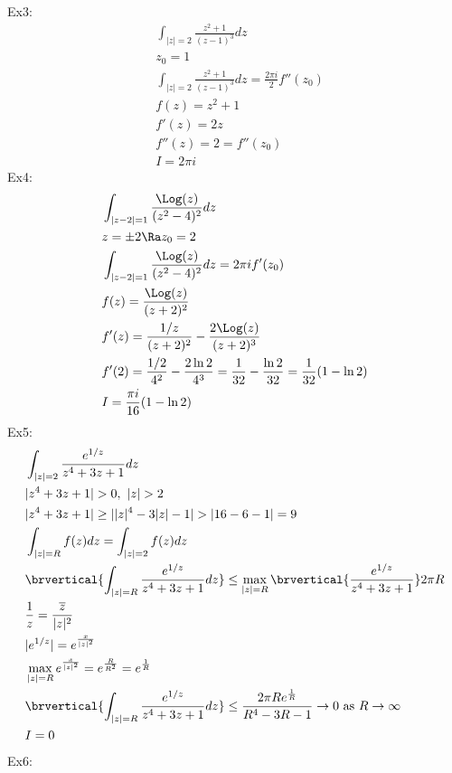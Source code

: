 Ex3:
\begin{align*}
    &\int_{|z|=2}\frac{z^2+1}{(z-1)^3}dz\\
    &z_0=1\\
    &\int_{|z|=2}\frac{z^2+1}{(z-1)^3}dz=\frac{2\pi i}{2}f''(z_0)\\
    &f(z)=z^2+1\\
    &f'(z)=2z\\
    &f''(z)=2=f''(z_0)\\
    &I=2\pi i
\end{align*}
Ex4:
\begin{align*}
    &\int_{|z-2|=1}\frac{\Log(z)}{(z^2-4)^2}dz\\
    &z=\pm 2\Ra z_0=2\\
    &\int_{|z-2|=1}\frac{\Log(z)}{(z^2-4)^2}dz=2\pi if'(z_0)\\
    &f(z)=\frac{\Log(z)}{(z+2)^2}\\
    &f'(z)=\frac{1/z}{(z+2)^2}-\frac{2\Log(z)}{(z+2)^3}\\
    &f'(2)=\frac{1/2}{4^2}-\frac{2\ln2}{4^3}=\frac{1}{32}-\frac{\ln2}{32}=\frac{1}{32}(1-\ln2)\\
    &I=\frac{\pi i}{16}(1-\ln2)
\end{align*}
Ex5:
\begin{align*}
    &\int_{|z|=2}\frac{e^{1/z}}{z^4+3z+1}dz\\
    &|z^4+3z+1|>0,\ |z|>2\\
    &|z^4+3z+1|\geq||z|^4-3|z|-1|>|16-6-1|=9\\
    &\int_{|z|=R}f(z)dz=\int_{|z|=2}f(z)dz\\
    &\brvertical{\int_{|z|=R}\frac{e^{1/z}}{z^4+3z+1}dz}\leq\max_{|z|=R}\brvertical{\frac{e^{1/z}}{z^4+3z+1}}2\pi R\\
    &\frac{1}{z}=\frac{\overline{z}}{|z|^2}\\
    &|e^{1/z}|=e^{\frac{x}{|z|^2}}\\
    &\max_{|z|=R}e^{\frac{x}{|z|^2}}=e^{\frac{R}{R^2}}=e^{\frac{1}{R}}\\
    &\brvertical{\int_{|z|=R}\frac{e^{1/z}}{z^4+3z+1}dz}\leq\frac{2\pi Re^{\frac{1}{R}}}{R^4-3R-1}\to0\text{ as }R\to\infty\\
    &I=0
\end{align*}
Ex6:
